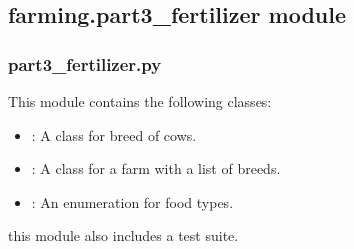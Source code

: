 \documentclass[letterpaper,10pt,english]{sphinxmanual}
\begin{document}
\subsection{farming.part3\_fertilizer module}
\label{\detokenize{farming:module-farming.part3_fertilizer}}\label{\detokenize{farming:farming-part3-fertilizer-module}}

\subsubsection{part3\_fertilizer.py}
\label{\detokenize{farming:part3-fertilizer-py}}
\sphinxAtStartPar
This module contains the following classes:
\begin{itemize}
\item {} 
\sphinxAtStartPar
{\hyperref[\detokenize{farming:farming.part3_fertilizer.Breed}]{}}: A class for breed of cows.

\item {} 
\sphinxAtStartPar
{\hyperref[\detokenize{farming:farming.part3_fertilizer.Farm}]{}}: A class for a farm with a list of breeds.

\item {} 
\sphinxAtStartPar
{\hyperref[\detokenize{farming:farming.part3_fertilizer.FoodType}]{}}: An enumeration for food types.

\end{itemize}

\sphinxAtStartPar
this module also includes a test suite.
\end{document}
